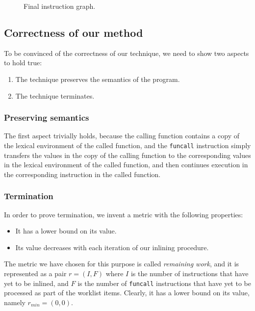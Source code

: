 \begin{figure}
\begin{center}
\end{center}
\caption{\label{fig47}
Final instruction graph.}
\end{figure}

\subsection{Correctness of our method}

To be convinced of the correctness of our technique, we need to show
two aspects to hold true:

\begin{enumerate}
\item The technique preserves the semantics of the program.
\item The technique terminates.
\end{enumerate}

\subsubsection{Preserving semantics}

The first aspect trivially holds, because the calling function contains
a copy of the lexical environment of the called function, and the
\texttt{funcall} instruction simply transfers the values in the
copy of the calling function to the corresponding values in the
lexical environment of the called function, and then continues
execution in the corresponding instruction in the called function.

\subsubsection{Termination}

In order to prove termination, we invent a metric with the following
properties:

\begin{itemize}
\item It has a lower bound on its value.
\item Its value decreases with each iteration of our inlining
  procedure.
\end{itemize}

The metric we have chosen for this purpose is called \emph{remaining
  work}, and it is represented as a pair $r = (I,F)$ where $I$ is the
number of instructions that have yet to be inlined, and $F$ is the
number of \texttt{funcall} instructions that have yet to be processed
as part of the worklist items.  Clearly, it has a lower bound on its
value, namely $r_{min} = (0,0)$.

